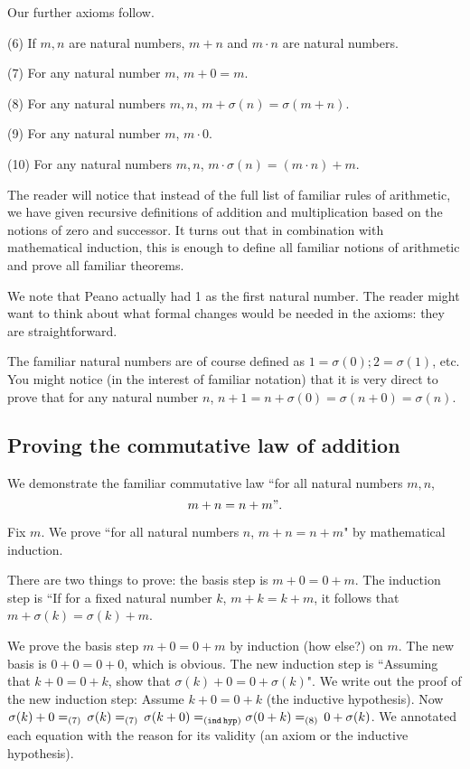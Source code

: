 \documentclass[12pt]{article}
\begin{document}
Our further axioms follow.

(6) If $m,n$ are natural numbers, $m+n$ and $m \cdot n$ are natural numbers.

(7) For any natural number $m$, $m+0=m$.

(8) For any natural numbers $m,n$, $m+\sigma(n) = \sigma(m+n)$.

(9) For any natural number $m$, $m \cdot   0$.

(10) For any natural numbers $m,n$, $m \cdot \sigma(n) = ( m \cdot n) + m$.

The reader will notice that instead of the full list of familiar rules of arithmetic, we have given recursive definitions of addition and multiplication based on the notions of zero and successor.
It turns out that in combination with mathematical induction, this is enough to define all familiar notions of arithmetic and prove all familiar theorems.

We note that Peano actually had 1 as the first natural number.  The reader might want to think about what formal changes would be needed in the axioms:  they are straightforward.

The familiar natural numbers are of course defined as $1 = \sigma(0);  2  = \sigma(1)$, etc.  You might notice (in the interest of familiar notation) that it is very direct to prove
that for any natural number $n$, $n+1  = n+\sigma(0) = \sigma(n+0) = \sigma(n)$.

\subsection{Proving the commutative law of addition}

We demonstrate the familiar commutative law ``for all natural numbers $m,n$, $$m+n=n+m".$$

Fix $m$.  We prove ``for all natural numbers $n$, $m+n=n+m$"  by mathematical induction.

There are two things to prove:  the basis step is $m+0 = 0+m$.  The induction step is ``If for a fixed natural number $k$, $m+k=k+m$, it follows that $m+\sigma(k) = \sigma(k)+m$.

We prove the basis step $m+0 = 0+m$ by induction (how else?) on $m$.  The new basis is $0+0=0+0$, which is obvious.   The new induction step is ``Assuming that $k+0 = 0+k$, show that $\sigma(k)+0 = 0 + \sigma(k)$".  We write out the proof of the new induction step:  Assume $k+0 =0+k$ (the inductive hypothesis).  Now $\sigma(k)+0 =_{(7)} \,\sigma(k) =_{(7)}\, \sigma(k+0) =_{({\tt ind\, hyp})} \sigma(0+k) =_{(8)}\, 0 +\sigma(k)$.  We annotated each equation with the reason for its validity (an axiom or the inductive hypothesis).
\end{document}
